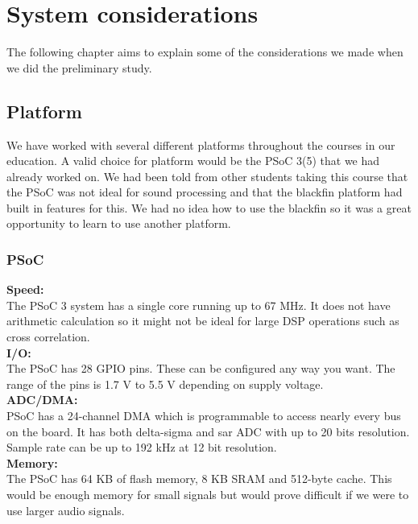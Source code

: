 \chapter{System considerations}
The following chapter aims to explain some of the considerations we made when we did the preliminary study. 
\section{Platform}
We have worked with several different platforms throughout the courses in our education. A valid choice for platform would be the PSoC 3(5) that we had already worked on. We had been told from other students taking this course that the PSoC was not ideal for sound processing and that the blackfin platform had built in features for this. We had no idea how to use the blackfin so it was a great opportunity to learn to use another platform. 
\subsection{PSoC}
\textbf{Speed:}\\
The PSoC 3 system has a single core running up to 67 MHz. It does not have arithmetic calculation so it might not be ideal for large DSP operations such as cross correlation. \\
\textbf{I/O:}\\
The PSoC has 28 GPIO pins. These can be configured any way you want. The range of the pins is 1.7 V to 5.5 V depending on supply voltage. \\
\textbf{ADC/DMA:}\\
PSoC has a 24-channel DMA which is programmable to access nearly every bus on the board. It has both delta-sigma and sar ADC with up to 20 bits resolution. Sample rate can be up to 192 kHz at 12 bit resolution. \\
\textbf{Memory:}\\
The PSoC has 64 KB of flash memory, 8 KB SRAM and 512-byte cache. This would be enough memory for small signals but would prove difficult if we were to use larger audio signals.\\

